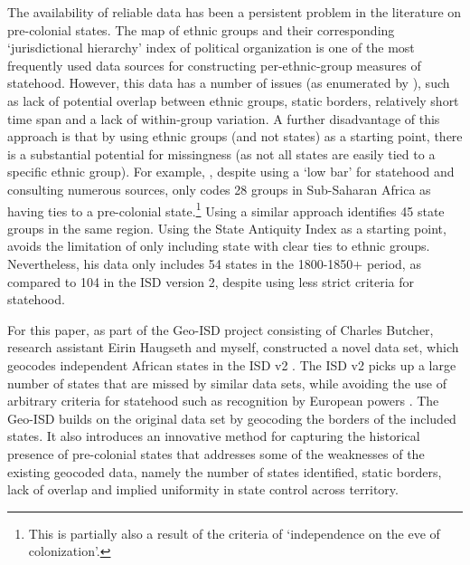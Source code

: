\documentclass[12pt]{article}
\begin{document}
The availability of reliable data has been a persistent problem in the
literature on pre-colonial states. The \citet{Murdock1967} map of ethnic groups
and their corresponding `jurisdictional hierarchy' index of political
organization is one of the most frequently used data sources for constructing
per-ethnic-group measures of statehood. However, this data has a number of
issues (as enumerated by \citet{Michalopoulos2018}), such as lack of potential
overlap between ethnic groups, static borders, relatively short time
span and a lack of within-group variation. A further disadvantage of this approach
is that by using ethnic groups (and not states) as a starting point, there is a
substantial potential for missingness (as not all states are easily tied to a
specific ethnic group). For example, \citet{Paine2019}, despite using a `low bar'
for statehood and consulting numerous sources, only codes 28 groups in
Sub-Saharan Africa as having ties to a pre-colonial state.\footnote{This is
partially also a result of the criteria of `independence on the eve of
colonization'.} Using a similar approach \citet{Wig2016} identifies 45 state
groups in the same region. Using the State Antiquity Index
\citep{Bockstette2012} as a starting point, \citet{Depetris-Chauvin2016} avoids
the limitation of only including state with clear ties to ethnic groups.
Nevertheless, his data only includes 54 states in the 1800-1850+ period, as
compared to 104 in the ISD version 2, despite using less strict criteria for
statehood.

For this paper, as part of the Geo-ISD project consisting of Charles Butcher,
research assistant Eirin Haugseth and myself, constructed a novel data set,
which geocodes independent African states in the ISD v2 \citep{Butcher2020}. The
ISD v2 picks up a large number of states that are missed by similar data sets,
while avoiding the use of arbitrary criteria for statehood such as recognition by
European powers \citep{Butcher2020}. The Geo-ISD builds on the original data set
by geocoding the borders of the included states. It also introduces an
innovative method for capturing the historical presence of pre-colonial states
that addresses some of the weaknesses of the existing geocoded data, namely the
number of states identified, static borders, lack of overlap and implied
uniformity in state control across territory.
\end{document}
